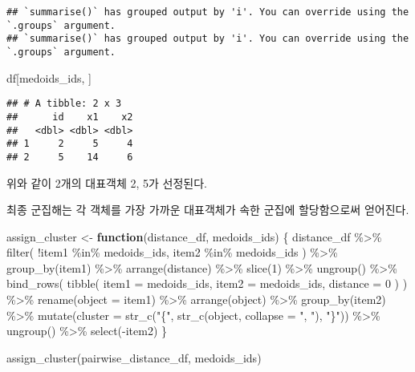 \documentclass[
]{book}
\newenvironment{Shaded}{\begin{snugshade}}{\end{snugshade}}
\newcommand{\AttributeTok}[1]{\textcolor[rgb]{0.77,0.63,0.00}{#1}}
\newcommand{\ControlFlowTok}[1]{\textcolor[rgb]{0.13,0.29,0.53}{\textbf{#1}}}
\newcommand{\DecValTok}[1]{\textcolor[rgb]{0.00,0.00,0.81}{#1}}
\newcommand{\FunctionTok}[1]{\textcolor[rgb]{0.00,0.00,0.00}{#1}}
\newcommand{\NormalTok}[1]{#1}
\newcommand{\OtherTok}[1]{\textcolor[rgb]{0.56,0.35,0.01}{#1}}
\newcommand{\SpecialCharTok}[1]{\textcolor[rgb]{0.00,0.00,0.00}{#1}}
\newcommand{\StringTok}[1]{\textcolor[rgb]{0.31,0.60,0.02}{#1}}
\begin{document}
\begin{verbatim}
## `summarise()` has grouped output by 'i'. You can override using the `.groups` argument.
## `summarise()` has grouped output by 'i'. You can override using the `.groups` argument.
\end{verbatim}

\begin{Shaded}
\begin{Highlighting}[]
\NormalTok{df[medoids\_ids, ]}
\end{Highlighting}
\end{Shaded}

\begin{verbatim}
## # A tibble: 2 x 3
##      id    x1    x2
##   <dbl> <dbl> <dbl>
## 1     2     5     4
## 2     5    14     6
\end{verbatim}

위와 같이 2개의 대표객체 2, 5가 선정된다.

최종 군집해는 각 객체를 가장 가까운 대표객체가 속한 군집에 할당함으로써 얻어진다.

\begin{Shaded}
\begin{Highlighting}[]
\NormalTok{assign\_cluster }\OtherTok{\textless{}{-}} \ControlFlowTok{function}\NormalTok{(distance\_df, medoids\_ids) \{}
\NormalTok{  distance\_df }\SpecialCharTok{\%\textgreater{}\%}
    \FunctionTok{filter}\NormalTok{(}
      \SpecialCharTok{!}\NormalTok{item1 }\SpecialCharTok{\%in\%}\NormalTok{ medoids\_ids,}
\NormalTok{      item2 }\SpecialCharTok{\%in\%}\NormalTok{ medoids\_ids}
\NormalTok{    ) }\SpecialCharTok{\%\textgreater{}\%}
    \FunctionTok{group\_by}\NormalTok{(item1) }\SpecialCharTok{\%\textgreater{}\%}
    \FunctionTok{arrange}\NormalTok{(distance) }\SpecialCharTok{\%\textgreater{}\%}
    \FunctionTok{slice}\NormalTok{(}\DecValTok{1}\NormalTok{) }\SpecialCharTok{\%\textgreater{}\%}
    \FunctionTok{ungroup}\NormalTok{() }\SpecialCharTok{\%\textgreater{}\%}
    \FunctionTok{bind\_rows}\NormalTok{(}
      \FunctionTok{tibble}\NormalTok{(}
        \AttributeTok{item1 =}\NormalTok{ medoids\_ids,}
        \AttributeTok{item2 =}\NormalTok{ medoids\_ids,}
        \AttributeTok{distance =} \DecValTok{0}
\NormalTok{      )}
\NormalTok{    ) }\SpecialCharTok{\%\textgreater{}\%}
    \FunctionTok{rename}\NormalTok{(}\AttributeTok{object =}\NormalTok{ item1) }\SpecialCharTok{\%\textgreater{}\%}
    \FunctionTok{arrange}\NormalTok{(object) }\SpecialCharTok{\%\textgreater{}\%}
    \FunctionTok{group\_by}\NormalTok{(item2) }\SpecialCharTok{\%\textgreater{}\%}
    \FunctionTok{mutate}\NormalTok{(}\AttributeTok{cluster =} \FunctionTok{str\_c}\NormalTok{(}\StringTok{"\{"}\NormalTok{, }\FunctionTok{str\_c}\NormalTok{(object, }\AttributeTok{collapse =} \StringTok{", "}\NormalTok{), }\StringTok{"\}"}\NormalTok{)) }\SpecialCharTok{\%\textgreater{}\%}
    \FunctionTok{ungroup}\NormalTok{() }\SpecialCharTok{\%\textgreater{}\%}
    \FunctionTok{select}\NormalTok{(}\SpecialCharTok{{-}}\NormalTok{item2)}
\NormalTok{\}}

\FunctionTok{assign\_cluster}\NormalTok{(pairwise\_distance\_df, medoids\_ids)}
\end{Highlighting}
\end{Shaded}
\end{document}
